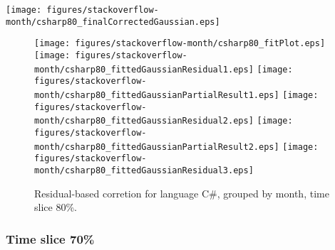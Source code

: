 \begin{center}
{\texttt{[image: figures/stackoverflow-month/csharp80\_finalCorrectedGaussian.eps]}}
\end{center}

\FloatBarrier

\begin{figure}[t]
\centering
{}
{\texttt{[image: figures/stackoverflow-month/csharp80\_fitPlot.eps]}}
{\texttt{[image: figures/stackoverflow-month/csharp80\_fittedGaussianResidual1.eps]}}
{\texttt{[image: figures/stackoverflow-month/csharp80\_fittedGaussianPartialResult1.eps]}}
{\texttt{[image: figures/stackoverflow-month/csharp80\_fittedGaussianResidual2.eps]}}
{\texttt{[image: figures/stackoverflow-month/csharp80\_fittedGaussianPartialResult2.eps]}}
{\texttt{[image: figures/stackoverflow-month/csharp80\_fittedGaussianResidual3.eps]}}
\caption{Residual-based corretion for language C\#, grouped by month, time slice 80\%.}
\end{figure}


\FloatBarrier


\subsubsection{Time slice 70\%}

